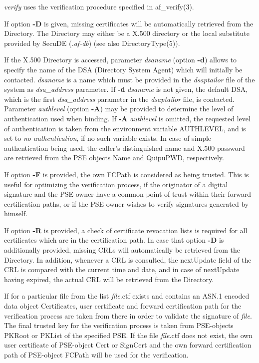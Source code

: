 {\em verify} uses the verification procedure specified in af\_verify(3).

If option {\bf -D} is given, missing certificates will be automatically retrieved from the Directory.
The Directory may either be a X.500 directory or the local substitute provided by 
SecuDE ({\em .af-db}) (see also DirectoryType(5)).

If the X.500 Directory is accessed, parameter {\em dsaname} (option {\bf -d}) allows to specify the name of the DSA (Directory System Agent) which
will initially be contacted. {\em dsaname} is a name which must be provided in the 
{\em dsaptailor} file of the system as {\em dsa\_address} parameter. If {\bf -d} {\em dsaname} is
not given, the default DSA, which is the first {\em dsa\_address} parameter in the {\em dsaptailor} 
file, is contacted.
Parameter {\em authlevel} (option {\bf -A}) may be provided to determine the level of authentication used when binding. If {\bf -A} {\em authlevel} is omitted, the requested 
level of authentication is taken from the environment variable AUTHLEVEL, and is set to {\em no 
authentication}, if no such variable exists.
In case of simple authentication being used, the caller's distinguished name and
X.500 password are retrieved from the PSE objects Name and QuipuPWD, respectively.

If option {\bf -F} is provided, the own FCPath is considered as being trusted.
This is useful for optimizing the verification process,
if the originator of a digital signature and the PSE owner have a common point of trust
within their forward certification paths, or if the PSE owner wishes to verify signatures
generated by himself.

If option {\bf -R} is provided, a check of certificate revocation lists is required for all certificates
which are in the certification path. In case that option {\bf -D} is additionally provided, missing CRLs will
automatically be retrieved from the Directory. In addition, whenever a CRL is consulted, the 
nextUpdate field of the CRL is compared with the current time and date, and in case of nextUpdate
having expired, the actual CRL will be retrieved from the Directory.

If for a particular file from the list {\em file}.ctf exists and contains an ASN.1 encoded data object Certificates, 
user certificate and forward 
certification path for the verification process are taken from there in order to validate the signature
of {\em file}. The final trusted key for 
the verification process is taken from PSE-objects PKRoot or PKList of the specified PSE.
If the file {\em file}.ctf does not exist, the own user certificate of PSE-object Cert or SignCert and
the own forward certification path of PSE-object FCPath will be used for the verification.

